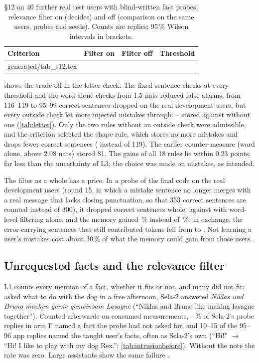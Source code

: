 \documentclass[10pt,twocolumn]{article}
\makeatletter
\newcommand*{\tablebody}[1]{\@@input generated/#1.tex }
\newcommand{\pct}{\,\%}
\makeatother
\begin{document}
\begin{table}[t]
\centering
\footnotesize
\caption{\S12 on 40 further real test users with blind-written fact probes: relevance filter on (decides) and off
(comparison on the same users, probes and seeds). Counts are replies; 95\pct{} Wilson intervals in brackets.}
\label{tab:s12}
\begin{tabular}{@{}llll@{}}
\toprule
Criterion & Filter on & Filter off & Threshold \\
\midrule
\tablebody{tab_s12}
\bottomrule
\end{tabular}
\end{table}

 shows the trade-off in the letter check. The fixed-sentence checks at every threshold and the
word-alone checks from 1.5 nats reduced false alarms, from 116--119 to 95--99 correct sentences dropped on the real
development users, but every outside check let more injected mistakes through: -- stored against  without one
(\cref{tab:letter}). Only the two rules without an outside check were admissible, and the criterion selected the shape
rule, which stores no more mistakes and drops fewer correct sentences ( instead of 119). The
earlier counter-measure (word alone, above 2.08 nats) stored 81. The gains of all 18 rules lie within 0.23 points, far
less than the uncertainty of L3; the choice was made on mistakes, as intended.

The filter as a whole has a price. In a probe of the final code on the real development users (round 15, in which a
mistake sentence no longer merges with a real message that lacks closing punctuation, so that 353 correct sentences are
counted instead of 300), it dropped
 correct sentences whole, against  with word-level filtering alone, and
the memory gained \pct{} instead of \pct; in exchange, the error-carrying
sentences that still contributed tokens fell from  to . Not learning a
user's mistakes cost about 30\pct{} of what the memory could gain from those users.

\subsection{Unrequested facts and the relevance filter}\label{sec:intrusion}

L1 counts every mention of a fact, whether it fits or not, and many did not fit: asked what to do with the dog in a
free afternoon, Sela-2 answered \emph{Niklas und Bruno machen gerne gemeinsam Lasagne} (``Niklas and Bruno like making
lasagne together''). Counted afterwards on consumed measurements, --\pct{} of Sela-2's
probe replies in arm F named a fact the probe had not asked for, and 10--15 of the 95--96 app replies named the taught user's
facts, often as Sela-2's own (``Hi!'' $\to$ ``Hi! I like to play with my dog Rex.''; \cref{tab:intrusionbefore}). Without
the note the rate was zero. Large assistants show the same failure \citep{hu2026opbench,feng2026rpeval}.
\end{document}
